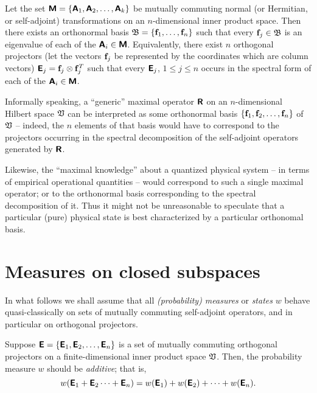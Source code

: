 Let the set $\textsf{\textbf{M}}
=
\{
\textsf{\textbf{A}}_1,
\textsf{\textbf{A}}_2,
\ldots ,
\textsf{\textbf{A}}_k
\}
$
be mutually commuting  normal (or Hermitian, or self-adjoint) transformations on an $n$-dimensional inner product space.
Then there exists an orthonormal basis
${\frak B}= \{
{\bf f}_1,
\ldots ,
{\bf f}_n\}$
such that every ${\bf f}_j \in {\frak B}$  is an eigenvalue  of each of the $\textsf{\textbf{A}}_i \in  \textsf{\textbf{M}}$.
Equivalently, there exist $n$ orthogonal projectors  (let the vectors ${\bf f}_j$ be represented by the coordinates which are column vectors)
$\textsf{\textbf{E}}_j= {\bf f}_j\otimes {\bf f}_j^T$
such that every $\textsf{\textbf{E}}_j$, $1\le j\le n$ occurs in the spectral form of each of the $\textsf{\textbf{A}}_i \in  \textsf{\textbf{M}}$.


Informally speaking,
a ``generic'' maximal operator $\textsf{\textbf{R}}$ on an $n$-dimensional Hilbert space ${\frak V}$
can be interpreted as some orthonormal basis
$\{{\bf f}_1,{\bf f}_2,\ldots ,{\bf f}_n\}$ of ${\frak V}$
-- indeed, the $n$ elements of that basis would have to correspond to the projectors occurring
in the spectral decomposition of the self-adjoint operators
generated by $\textsf{\textbf{R}}$.

{\color{Purple}
Likewise, the ``maximal knowledge'' about a quantized physical system -- in terms of empirical operational quantities --
would correspond to such a single maximal operator;
or to the orthonormal basis corresponding to the spectral decomposition of it.
Thus it might not be unreasonable to speculate that a particular (pure) physical state is best characterized by a particular orthonomal basis.
}


\section{Measures on closed subspaces}

In what follows we shall assume that all {\em (probability) measures}
or {\em states} $w$
behave quasi-classically on sets of mutually commuting self-adjoint operators,
and in particular on orthogonal projectors.

Suppose
 $\textsf{\textbf{E}}
=
\{
\textsf{\textbf{E}}_1,
\textsf{\textbf{E}}_2,
\ldots ,
\textsf{\textbf{E}}_n
\}
$
is a set of mutually commuting orthogonal projectors
on a finite-dimensional inner product space   ${\frak V}$.
Then, the probability measure $w$ should be {\em additive}; that is,
\begin{equation}
w(\textsf{\textbf{E}}_1+\textsf{\textbf{E}}_2\cdots +\textsf{\textbf{E}}_n)=
w(\textsf{\textbf{E}}_1)+
w(\textsf{\textbf{E}}_2)+
\cdots +
w(\textsf{\textbf{E}}_n).
\end{equation}

